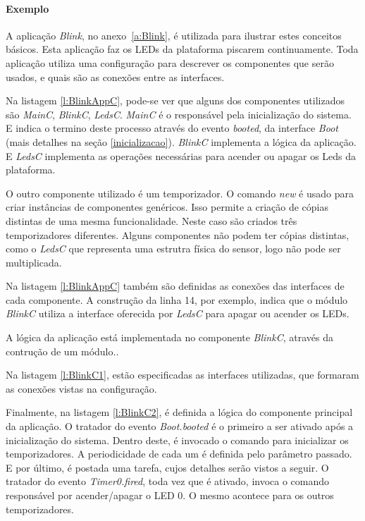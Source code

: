 \paragraph{Exemplo}
A aplicação \textit{Blink}, no anexo~\ref{a:Blink}, é utilizada para ilustrar estes conceitos básicos. Esta aplicação
faz os LEDs da plataforma piscarem continuamente.
Toda aplicação utiliza uma configuração para descrever os componentes que serão usados, e quais são as conexões entre
as interfaces.


Na listagem \ref{l:BlinkAppC}, pode-se ver que alguns dos componentes utilizados são \textit{MainC}, \textit{BlinkC}, \textit{LedsC}.
\textit{MainC} é o responsável pela inicialização do sistema. E indica o termino deste
processo através do evento \textit{booted}, da interface \textit{Boot} (mais detalhes na seção \ref{inicializacao}).
\textit{BlinkC} implementa a lógica da aplicação.
E \textit{LedsC} implementa as operações necessárias para acender ou apagar os Leds da plataforma.

O outro componente utilizado é um temporizador. O comando \textit{new} é usado para
criar instâncias de componentes genéricos. Isso permite a criação de cópias distintas de uma mesma funcionalidade.
Neste caso são criados três temporizadores diferentes.
Alguns componentes não podem ter cópias distintas, como o \textit{LedsC} que representa uma estrutra física do
sensor, logo não pode ser multiplicada.

Na listagem \ref{l:BlinkAppC} também são definidas as conexões das interfaces de cada componente.
A construção da linha 14, por exemplo, indica que o módulo \textit{BlinkC} utiliza a interface
oferecida por \textit{LedsC} para apagar ou acender os LEDs. 

A lógica da aplicação está implementada no componente \textit{BlinkC}, através da contrução de um módulo..

Na listagem \ref{l:BlinkC1}, estão especificadas as interfaces utilizadas, que formaram as conexões vistas na
configuração.


Finalmente, na listagem \ref{l:BlinkC2}, é definida a lógica do componente principal da aplicação.
O tratador do evento \textit{Boot.booted} é o primeiro a ser ativado após a inicialização do sistema.
Dentro deste, é invocado o comando para inicializar os temporizadores. A periodicidade de cada um é definida pelo
parâmetro passado. E por último, é postada uma tarefa, cujos detalhes serão vistos a seguir.
O tratador do evento \textit{Timer0.fired}, toda vez que é ativado, invoca o comando responsável por acender/apagar o
LED 0. O mesmo acontece para os outros temporizadores.

